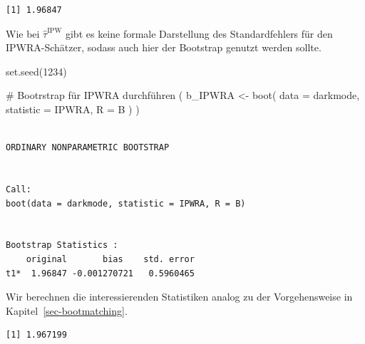 \documentclass[
  a4paper,
  DIV=11,
  oneside]{scrreprt}
\newenvironment{Shaded}{\begin{snugshade}}{\end{snugshade}}
\newcommand{\AttributeTok}[1]{\textcolor[rgb]{0.40,0.45,0.13}{#1}}
\newcommand{\CommentTok}[1]{\textcolor[rgb]{0.37,0.37,0.37}{#1}}
\newcommand{\DecValTok}[1]{\textcolor[rgb]{0.68,0.00,0.00}{#1}}
\newcommand{\FunctionTok}[1]{\textcolor[rgb]{0.28,0.35,0.67}{#1}}
\newcommand{\NormalTok}[1]{\textcolor[rgb]{0.00,0.23,0.31}{#1}}
\newcommand{\OtherTok}[1]{\textcolor[rgb]{0.00,0.23,0.31}{#1}}
\newcommand{\SpecialCharTok}[1]{\textcolor[rgb]{0.37,0.37,0.37}{#1}}
\begin{document}
\begin{verbatim}
[1] 1.96847
\end{verbatim}

Wie bei \(\widehat{\tau}^\text{IPW}\) gibt es keine formale Darstellung
des Standardfehlers für den IPWRA-Schätzer, sodass auch hier der
Bootstrap genutzt werden sollte.

\begin{Shaded}
\begin{Highlighting}[]
\FunctionTok{set.seed}\NormalTok{(}\DecValTok{1234}\NormalTok{)}

\CommentTok{\# Bootrstrap für IPWRA durchführen}
\NormalTok{(}
\NormalTok{  b\_IPWRA }\OtherTok{\textless{}{-}} \FunctionTok{boot}\NormalTok{(}
  \AttributeTok{data =}\NormalTok{ darkmode,}
  \AttributeTok{statistic =}\NormalTok{ IPWRA,}
  \AttributeTok{R =}\NormalTok{ B}
\NormalTok{  )}
\NormalTok{)}
\end{Highlighting}
\end{Shaded}

\begin{verbatim}

ORDINARY NONPARAMETRIC BOOTSTRAP


Call:
boot(data = darkmode, statistic = IPWRA, R = B)


Bootstrap Statistics :
    original       bias    std. error
t1*  1.96847 -0.001270721   0.5960465
\end{verbatim}

Wir berechnen die interessierenden Statistiken analog zu der
Vorgehensweise in Kapitel~\ref{sec-bootmatching}.

\begin{Shaded}
\end{Shaded}

\begin{verbatim}
[1] 1.967199
\end{verbatim}

\begin{Shaded}
\end{Shaded}
\end{document}
